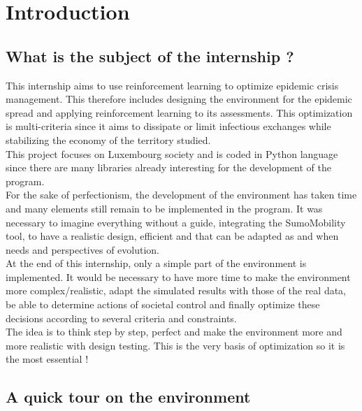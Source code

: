 \chapter*{Introduction}

\section*{What is the subject of the internship ?}

This internship aims to use reinforcement learning to optimize epidemic crisis management. This therefore includes designing the environment for the epidemic spread and applying reinforcement learning to its assessments. This optimization is multi-criteria since it aims to dissipate or limit infectious exchanges while stabilizing the economy of the territory studied.\\

This project focuses on Luxembourg society and is coded in Python language since there are many libraries already interesting for the development of the program.\\

For the sake of perfectionism, the development of the environment has taken time and many elements still remain to be implemented in the program. It was necessary to imagine everything without a guide, integrating the SumoMobility tool, to have a realistic design, efficient and that can be adapted as and when needs and perspectives of evolution.\\

At the end of this internship, only a simple part of the environment is implemented. It would be necessary to have more time to make the environment more complex/realistic, adapt the simulated results with those of the real data, be able to determine actions of societal control and finally optimize these decisions according to several criteria and constraints.\\

The idea is to think step by step, perfect and make the environment more and more realistic with design testing. This is the very basis of optimization so it is the most essential !

\newpage

\section*{A quick tour on the environment}

